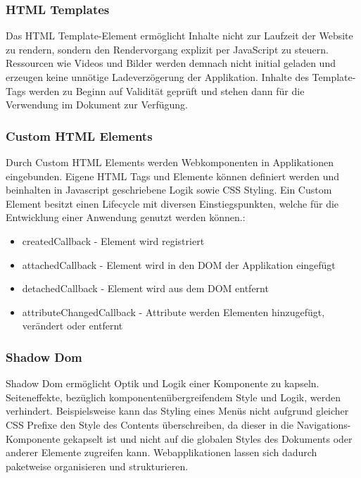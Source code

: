 \vspace{0.3cm}

\vspace{0.3cm}

\subsubsection{HTML Templates}

Das HTML Template-Element ermöglicht Inhalte nicht zur Laufzeit der Website zu rendern,
sondern den Rendervorgang explizit per JavaScript zu steuern. Ressourcen wie Videos und Bilder werden demnach
nicht initial geladen und erzeugen keine unnötige Ladeverzögerung der Applikation.
Inhalte des Template-Tags werden zu Beginn auf Validität geprüft und stehen dann für die Verwendung im Dokument
zur Verfügung.

\subsubsection{Custom HTML Elements}

Durch Custom HTML Elements werden Webkomponenten in Applikationen eingebunden.
Eigene HTML Tags und Elemente können definiert werden und beinhalten in Javascript geschriebene Logik sowie CSS Styling.
Ein Custom Element besitzt einen Lifecycle mit diversen Einstiegspunkten, welche für die Entwicklung einer Anwendung genutzt werden können.:

\begin{itemize}
\item createdCallback - Element wird registriert
\item attachedCallback - Element wird in den DOM der Applikation eingefügt
\item detachedCallback - Element wird aus dem DOM entfernt
\item attributeChangedCallback - Attribute werden Elementen hinzugefügt, verändert oder entfernt
\end{itemize}


\subsubsection{Shadow Dom}
Shadow Dom ermöglicht Optik und Logik einer Komponente zu kapseln.
Seiteneffekte, bezüglich komponentenübergreifendem Style und Logik, werden verhindert.
Beispielsweise kann das Styling eines Menüs nicht aufgrund gleicher CSS Prefixe den Style des Contents überschreiben,
da dieser in die Navigations-Komponente gekapselt ist und nicht auf die globalen Styles des Dokuments oder anderer Elemente zugreifen kann.
Webapplikationen lassen sich dadurch paketweise organisieren und strukturieren.
